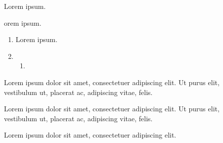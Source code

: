 \documentclass[twocolumn]{ctexart}
\begin{document}
\begin{xchoices}
  \item Lorem ipsum.
  \item orem ipsum.
\end{xchoices}
\lipsum[1]

\begin{enumerate}
  \item Lorem ipsum.
  \item \begin{enumerate}
    \item {}
  \end{enumerate}
\end{enumerate}
Lorem ipsum dolor sit amet, consectetuer adipiscing elit.
        Ut purus elit, vestibulum ut, placerat ac, adipiscing vitae, felis.
\begin{xchoices}
  \item Lorem ipsum dolor sit amet, consectetuer adipiscing elit.
    Ut purus elit, vestibulum ut, placerat ac, adipiscing vitae, felis.
  \item Lorem ipsum dolor sit amet, consectetuer adipiscing elit.
\end{xchoices}

\lipsum[1]
\end{document}
